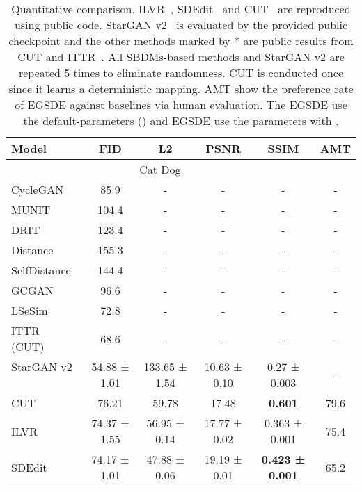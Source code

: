 \documentclass{article}
\begin{document}
\begin{table}
\caption{Quantitative comparison. ILVR~\cite{choi2021ilvr}, SDEdit~\cite{meng2021sdedit} and CUT~\cite{park2020contrastive} are reproduced using public code. StarGAN v2~\cite{choi2020stargan} is evaluated by the provided public checkpoint and the other methods marked by * are public results from CUT\cite{park2020contrastive} and ITTR~\cite{zheng2022ittr}. All SBDMs-based methods and StarGAN v2 are repeated 5 times to eliminate randomness. CUT is conducted once since it learns a deterministic mapping. AMT show the preference rate of EGSDE against baselines via human evaluation. The EGSDE use the default-parameters () and EGSDE use the parameters with .}
\vspace{.2cm}
\label{tb:two doamin}
\centering
\renewcommand\arraystretch{1}
\begin{tabular}{lccccc} 
\toprule
Model         & FID                   & L2                    & PSNR                  & SSIM    & AMT                 \\
\midrule
\multicolumn{5}{c}{Cat  Dog}                                                                          \\ 
\midrule
CycleGAN~\cite{zhu2017unpaired}      & 85.9 &- & -&-&-\\
MUNIT~\cite{huang2018multimodal}         & 104.4 &-&-&-&-\\
DRIT~\cite{lee2018diverse}         & 123.4 &-&-&-&-\\
Distance~\cite{benaim2017one}     &155.3 &-&-&-&-\\
SelfDistance~\cite{benaim2017one} &144.4 &-&-&-&-\\
GCGAN~\cite{fu2019geometry}        & 96.6 &-&-&-&-\\
LSeSim~\cite{zheng2021spatially}       & 72.8 &-&-&-&-\\
ITTR (CUT)~\cite{zheng2022ittr}   & 68.6 &-&-&-&-\\
StarGAN v2 ~\cite{choi2020stargan}          & 54.88 ± 1.01              & 133.65 ± 1.54               & 10.63 ± 0.10               & 0.27 ± 0.003 &-\\ 
CUT~\cite{park2020contrastive}           & 76.21               & 59.78               & 17.48               & \textbf{0.601} & 79.6\\       
\midrule
ILVR~\cite{choi2021ilvr}          & 74.37 ± 1.55          & 56.95 ± 0.14          & 17.77 ± 0.02          & 0.363 ± 0.001  & 75.4        \\
SDEdit~\cite{meng2021sdedit}        & 74.17 ± 1.01          & 47.88 ± 0.06          & 19.19 ± 0.01          & \textbf{0.423 ± 0.001} & 65.2  \\

\end{tabular}
\end{table}
\end{document}
